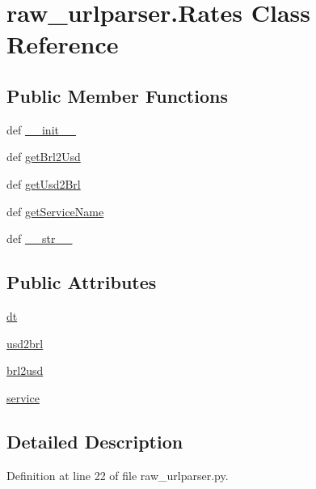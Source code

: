 \hypertarget{classraw__urlparser_1_1_rates}{\section{raw\-\_\-urlparser.\-Rates Class Reference}
\label{classraw__urlparser_1_1_rates}
}
\subsection*{Public Member Functions}
\begin{DoxyCompactItemize}
\item 
def \hyperlink{classraw__urlparser_1_1_rates_a2de6334a686a8a81c619d99de46e43df}{\-\_\-\-\_\-init\-\_\-\-\_\-}
\item 
def \hyperlink{classraw__urlparser_1_1_rates_a435ff5562321da275bb95823a346bc5c}{get\-Brl2\-Usd}
\item 
def \hyperlink{classraw__urlparser_1_1_rates_aaf3f32369f17da5fc903a7a51feca25f}{get\-Usd2\-Brl}
\item 
def \hyperlink{classraw__urlparser_1_1_rates_a4579624e853a4d83c5b7df9c390de5b5}{get\-Service\-Name}
\item 
def \hyperlink{classraw__urlparser_1_1_rates_a166ead3ebf1546ec2ea3eb299d524a30}{\-\_\-\-\_\-str\-\_\-\-\_\-}
\end{DoxyCompactItemize}
\subsection*{Public Attributes}
\begin{DoxyCompactItemize}
\item 
\hyperlink{classraw__urlparser_1_1_rates_a09b3c7cb595f3135c3eda648b1bb4c3f}{dt}
\item 
\hyperlink{classraw__urlparser_1_1_rates_a52d9b688be8385a87783b27839749b4a}{usd2brl}
\item 
\hyperlink{classraw__urlparser_1_1_rates_adc9df007bec75344f9f89cb631d1aeb3}{brl2usd}
\item 
\hyperlink{classraw__urlparser_1_1_rates_acb05316e95a39bc42590a882712f854b}{service}
\end{DoxyCompactItemize}


\subsection{Detailed Description}


Definition at line 22 of file raw\-\_\-urlparser.\-py.



